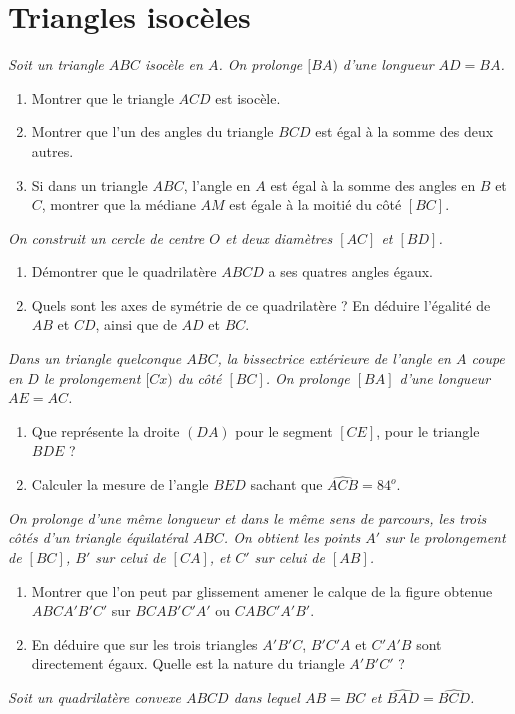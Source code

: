 \chapter{Triangles isocèles}
\begin{itemize}
\it Soit un triangle $ABC$ isocèle en $A$. On prolonge $[BA)$ d'une longueur $AD=BA$. \begin{enumerate}
\item Montrer que le triangle $ACD$ est isocèle. 
\item Montrer que l'un des angles du triangle $BCD$ est égal à la somme des deux autres. 
\item Si dans un triangle $ABC$, l'angle en $A$ est égal à la somme des angles en $B$ et $C$, montrer que la médiane $AM$ est égale à la moitié du côté $[BC]$.
\end{enumerate}
\it On construit un cercle de centre $O$ et deux diamètres $[AC]$ et $[BD]$.\begin{enumerate}
\item Démontrer que le quadrilatère $ABCD$ a ses quatres angles égaux. 
\item Quels sont les axes de symétrie de ce quadrilatère ? En déduire l'égalité de $AB$ et $CD$, ainsi que de $AD$ et $BC$.
\end{enumerate}
\it Dans un triangle quelconque $ABC$, la bissectrice extérieure de l'angle en $A$ coupe en $D$ le prolongement $[Cx)$ du côté $[BC]$. On prolonge $[BA]$ d'une longueur $AE=AC$. \begin{enumerate}
\item Que représente la droite $(DA)$ pour le segment $[CE]$, pour le triangle $BDE$ ? 
\item Calculer la mesure de l'angle $BED$ sachant que $\widehat{ACB}=84^o$.
\end{enumerate}
\it On prolonge d'une même longueur et dans le même sens de parcours, les trois côtés d'un triangle équilatéral $ABC$. On obtient les points $A'$ sur le prolongement de $[BC]$, $B'$ sur celui de $[CA]$, et $C'$ sur celui de $[AB]$.\begin{enumerate}
\item Montrer que l'on peut par glissement amener le 
calque de la figure obtenue $ABCA'B'C'$ sur $BCAB'C'A'$ ou $CABC'A'B'$.
\item En déduire que sur les trois triangles $A'B'C$, $B'C'A$ et $C'A'B$ sont directement égaux. Quelle est la nature du triangle $A'B'C'$ ?
\end{enumerate}
\it Soit un quadrilatère convexe $ABCD$ dans lequel $AB=BC$ et $\widehat{BAD}=\widehat{BCD}$.

\end{itemize}
